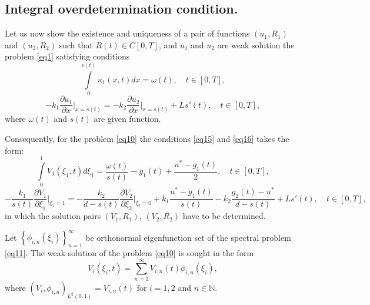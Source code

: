 \documentclass[preprint,12pt,authoryear]{elsarticle}
\begin{document}
\subsection{Integral overdetermination condition.}\label{sec1} Let us now show the existence and uniqueness of a pair of functions $(u_1,R_1)$ and $(u_2,R_2)$ such that $R(t)\in C[0,T]$, and $u_1$ and $u_2$ are weak solution the problem \eqref{eq1} satisfying conditions
    \begin{equation}\label{eq15}
        \int\limits_0^{s(t)}u_1(x,t)dx=\omega(t),\quad t\in[0,T],
    \end{equation}
    \begin{equation}\label{eq16}
        -k_1\dfrac{\partial u_1}{\partial x}\bigg|_{x=s(t)}=-k_2\dfrac{\partial u_2}{\partial x}\bigg|_{x=s(t)}+L s'(t),\quad t\in[0,T],
    \end{equation}
where $\omega(t)$ and $s(t)$ are given function.

Consequently, for the problem \eqref{eq10} the conditions \eqref{eq15} and \eqref{eq16} takes the form:
\begin{equation}\label{eq17}
    \int\limits_0^1 V_1(\xi_1,t)d\xi_1=\dfrac{\omega(t)}{s(t)}-g_1(t)+\dfrac{u^*-g_1(t)}{2},\quad t\in[0,T],
\end{equation}
\begin{equation}\label{eq18}
    -\dfrac{k_1}{s(t)}\dfrac{\partial V_1}{\partial \xi_1}\bigg|_{\xi_1=1}=-\dfrac{k_2}{d-s(t)}\dfrac{\partial V_2}{\partial\xi_2}\bigg|_{\xi_2=0}+k_1\frac{u^*-g_1(t)}{s(t)}-k_2\frac{g_2(t)-u^*}{d-s(t)}+Ls'(t),\quad t\in[0,T],
\end{equation}
in which the solution pairs $(V_1,R_1)$, $(V_2, R_2)$ have to be determined.

Let $\left\{\phi_{i,n}(\xi_i)\right\}_{n=1}^{\infty}$ be orthonormal eigenfunction set of the spectral problem \eqref{eq11}. The weak solution of the problem \eqref{eq10} is sought in the form 
\begin{equation}\label{eq19}
    V_i(\xi_i,t)=\sum\limits_{n=1}^{\infty}V_{i,n}(t)\phi_{i,n}(\xi_i),
\end{equation}
where $(V_i,\phi_{i,n})_{L^2(0,1)}=V_{i,n}(t)$ for $i=1,2$ and $n\in\mathbb{N}$.
\end{document}
